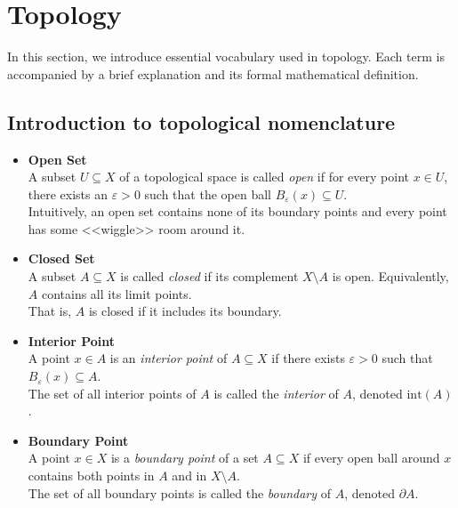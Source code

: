 \section{Topology}

In this section, we introduce essential vocabulary used in topology. Each term is accompanied by a brief explanation and its formal mathematical definition.

\subsection{Introduction to topological nomenclature}
\begin{itemize}[label=$-$]

	\item \textbf{Open Set} \\
	      A subset \( U \subseteq X \) of a topological space is called \emph{open} if for every point \( x \in U \), there exists an \( \varepsilon > 0 \) such that the open ball \( B_\varepsilon(x) \subseteq U \). \\
	      Intuitively, an open set contains none of its boundary points and every point has some <<wiggle>> room around it.

	\item \textbf{Closed Set} \\
	      A subset \( A \subseteq X \) is called \emph{closed} if its complement \( X \setminus A \) is open. Equivalently, \( A \) contains all its limit points. \\
	      That is, \( A \) is closed if it includes its boundary.

	\item \textbf{Interior Point}\\
	      A point \( x \in A \) is an \emph{interior point} of \( A \subseteq X \) if there exists \( \varepsilon > 0 \) such that \( B_\varepsilon(x) \subseteq A \). \\
	      The set of all interior points of \( A \) is called the \emph{interior} of \( A \), denoted \( \mathrm{int}(A) \).

	\item \textbf{Boundary Point}\\
	      A point \( x \in X \) is a \emph{boundary point} of a set \( A \subseteq X \) if every open ball around \( x \) contains both points in \( A \) and in \( X \setminus A \). \\
	      The set of all boundary points is called the \emph{boundary} of \( A \), denoted \( \partial A \).


\end{itemize}
